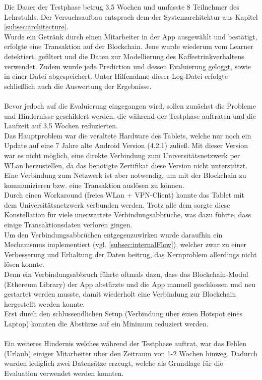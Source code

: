 Die Dauer der Testphase betrug 3,5 Wochen und umfasste 8 Teilnehmer des Lehrstuhls. Der Versuchsaufbau entsprach dem der Systemarchitektur aus Kapitel \ref{subsec:architecture}. \\
Wurde ein Getränk durch einen Mitarbeiter in der App ausgewählt und bestätigt, erfolgte eine Transaktion auf der Blockchain. Jene wurde wiederum vom Learner detektiert, gefiltert und die Daten zur Modellierung des Kaffeetrinkverhaltens verwendet. Zudem wurde jede Prediction und dessen Evaluierung geloggt, sowie in einer Datei abgespeichert. Unter Hilfenahme dieser Log-Datei erfolgte schließlich auch die Auswertung der Ergebnisse.\\\\
Bevor jedoch auf die Evaluierung eingegangen wird, sollen zunächst die Probleme und Hindernisse geschildert werden, die während der Testphase auftraten und die Laufzeit auf 3,5 Wochen reduzierten.\\
Das Hauptproblem war die veraltete Hardware des Tablets, welche nur noch ein Update auf eine 7 Jahre alte Android Version (4.2.1) zuließ. Mit dieser Version war es nicht möglich, eine direkte Verbindung zum Universitätsnetzwerk per WLan herzustellen, da das benötigte Zertifikat diese Version nicht unterstützt. Eine Verbindung zum Netzwerk ist aber notwendig, um mit der Blockchain zu kommunizieren bzw. eine Transaktion auslösen zu können. \\
Durch einen Workaround (freies WLan + VPN-Client) konnte das Tablet mit dem Universitätsnetzwerk verbunden werden. Trotz alle dem sorgte diese Konstellation für viele unerwartete Verbindungsabbrüche, was dazu führte, dass einige Transaktionsdaten verloren gingen. \\
Um den Verbindungsabbrüchen entgegenzuwirken wurde daraufhin ein Mechanismus implementiert (vgl. \ref{subsec:internalFlow}), welcher zwar zu einer Verbesserung und Erhaltung der Daten beitrug, das Kernproblem allerdings nicht lösen konnte. \\ 
Denn ein Verbindungsabbruch führte oftmals dazu, dass das Blockchain-Modul (Ethereum Library) der App abstürzte und die App manuell geschlossen und neu gestartet werden musste, damit wiederholt eine Verbindung zur Blockchain hergestellt werden konnte. \\
Erst durch den schlussendlichen Setup (Verbindung über einen Hotspot eines Laptop) konnten die Abstürze auf ein Minimum reduziert werden.\\\\
Ein weiteres Hindernis welches während der Testphase auftrat, war das Fehlen (Urlaub) einiger Mitarbeiter über den Zeitraum von 1-2 Wochen hinweg. Dadurch wurden lediglich zwei Datensätze erzeugt, welche als Grundlage für die Evaluation verwendet werden konnten. 


